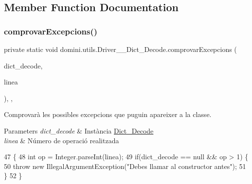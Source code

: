 \subsection{Member Function Documentation}
\mbox{\label{classdomini_1_1utils_1_1Driver____Dict__Decode_a41ddfd0f1473de9401aa7860cff2f3e8}} 
\subsubsection{\texorpdfstring{comprovar\+Excepcions()}{comprovarExcepcions()}}
{\footnotesize\ttfamily private static void domini.\+utils.\+Driver\+\_\+\+\_\+\+Dict\+\_\+\+Decode.\+comprovar\+Excepcions (\begin{DoxyParamCaption}\item[{\hyperlink{classdomini_1_1utils_1_1Dict__Decode}{Dict\+\_\+\+Decode}}]{dict\+\_\+decode,  }\item[{String}]{linea }\end{DoxyParamCaption})\hspace{0.3cm}{\ttfamily [inline]}, {\ttfamily [static]}, {\ttfamily [private]}}



Comprovarà les possibles excepcions que puguin apareixer a la classe. 


\begin{DoxyParams}{Parameters}
{\em dict\+\_\+decode} & Instància \hyperlink{classdomini_1_1utils_1_1Dict__Decode}{Dict\+\_\+\+Decode} \\
\hline
{\em linea} & Número de operació realitzada \\
\hline
\end{DoxyParams}

\begin{DoxyCode}
47                                                                                   \{
48         \textcolor{keywordtype}{int} op = Integer.parseInt(linea);
49         \textcolor{keywordflow}{if}(dict\_decode == null && op > 1) \{
50             \textcolor{keywordflow}{throw} \textcolor{keyword}{new} IllegalArgumentException(\textcolor{stringliteral}{"Debes llamar al constructor antes"});
51         \}
52     \}
\end{DoxyCode}
\mbox{\label{classdomini_1_1utils_1_1Driver____Dict__Decode_a5045c12e35617afd929dfeb30930d541}} 
